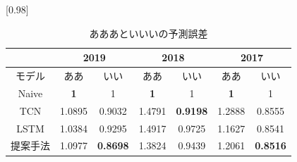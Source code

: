 \begin{table}[H]
	\caption{あああといいいの予測誤差}
	\centering
	\scalebox{0.98}[0.98]{
		\begin{tabular}{c|c|c|c|c|c|c}
			\multicolumn{1}{c}{} & \multicolumn{2}{|c|}{2019} 
			& \multicolumn{2}{c|}{2018} & \multicolumn{2}{c}{2017}\\ \hline \hline
			モデル    & ああ & いい & ああ & いい & ああ & いい \\ \hline
			Naive    & \bf{1} & 1 & \bf{1} & 1 & \bf{1} & 1 \\
			TCN      & 1.0895 & 0.9032 & 1.4791 & \bf{0.9198} & 1.2888 & 0.8555 \\
			LSTM     & 1.0384 & 0.9295 & 1.4917 & 0.9725 & 1.1627 & 0.8541 \\
			提案手法  & 1.0977 & \bf{0.8698} & 1.3824 & 0.9439 & 1.2061 & \bf{0.8516} \\
		\end{tabular}
	}
	\label{table:result-2}
\end{table}
